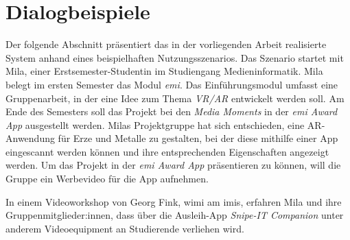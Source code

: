 \chapter{Dialogbeispiele}
\label{chapter-dialogbeispiel}
Der folgende Abschnitt präsentiert das in der vorliegenden Arbeit realisierte
System anhand eines beispielhaften Nutzungsszenarios. Das Szenario startet mit
Mila, einer Erstsemester-Studentin im Studiengang Medieninformatik. Mila belegt
im ersten Semester das Modul \textit{\ac{emi}}. Das Einführungsmodul umfasst
eine Gruppenarbeit, in der eine Idee zum Thema \textit{VR/AR} entwickelt werden
soll. Am Ende des Semesters soll das Projekt bei den \textit{Media Moments} in
der \textit{\ac{emi} Award App} \cite{canzler2022} ausgestellt werden.
Milas Projektgruppe hat sich entschieden, eine AR-Anwendung für Erze und Metalle
zu gestalten, bei der diese mithilfe einer App eingescannt werden
können und ihre entsprechenden Eigenschaften angezeigt werden. Um das Projekt in
der \textit{\ac{emi} Award App} präsentieren zu können, will die Gruppe ein
Werbevideo für die App aufnehmen.

In einem Videoworkshop von Georg Fink, \ac{wimi} am \ac{imis}, erfahren
Mila und ihre Gruppenmitglieder:innen, dass über die Ausleih-App
\textit{Snipe-IT Companion} unter anderem Videoequipment an Studierende
verliehen wird.

